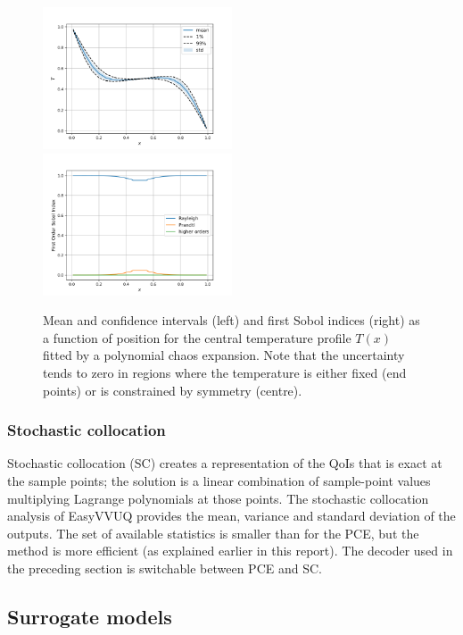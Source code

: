\begin{figure}[tbp]
\includegraphics[width=0.5\textwidth]{T_vs_x_mean_ci_nektar.png}
\includegraphics[width=0.5\textwidth]{T_vs_x_sobols_nektar.png}
\caption{%
Mean and confidence intervals (left) and first Sobol indices (right) as a function of position
for the central temperature profile $T(x)$ fitted by a polynomial chaos expansion.  Note that the uncertainty tends to zero in regions where the temperature is 
either fixed (end points) or is constrained by symmetry (centre).  
\label{fig:temp_profile}
}
\end{figure}

\subsubsection{Stochastic collocation}

Stochastic collocation (SC) creates a representation of the QoIs that is exact at the sample points; the solution is a linear combination of sample-point values multiplying Lagrange polynomials at those points.  
The stochastic collocation analysis of EasyVVUQ provides the mean, variance and standard deviation of the outputs.  
The set of available statistics is smaller than for the PCE, but the method is more efficient (as explained earlier in this report).  
The decoder used in the preceding section is switchable between PCE and SC.

\subsection{Surrogate models}

